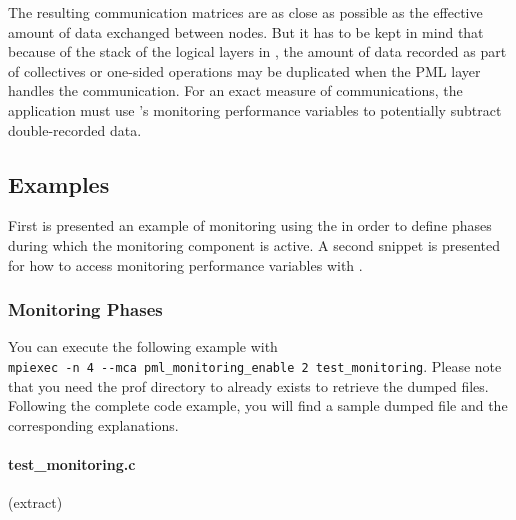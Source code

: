The resulting communication matrices are as close as possible as the
effective amount of data exchanged between nodes. But it has to be
kept in mind that because of the stack of the logical layers in
\ompi{}, the amount of data recorded as part of collectives or
one-sided operations may be duplicated when the PML layer handles the
communication. For an exact measure of communications, the application
must use \mpit{}'s monitoring performance variables to potentially
subtract double-recorded data.

\subsection{Examples}

First is presented an example of monitoring using the \mpit{} in order
to define phases during which the monitoring component is active. A
second snippet is presented for how to access monitoring performance
variables with \mpit{}.

\subsubsection{Monitoring Phases}

You can execute the following example with
\\ \verb|mpiexec -n 4 --mca pml_monitoring_enable 2 test_monitoring|. Please
note that you need the prof directory to already exists to retrieve
the dumped files. Following the complete code example, you will find a
sample dumped file and the corresponding explanations.

\paragraph{test\_monitoring.c} (extract)

